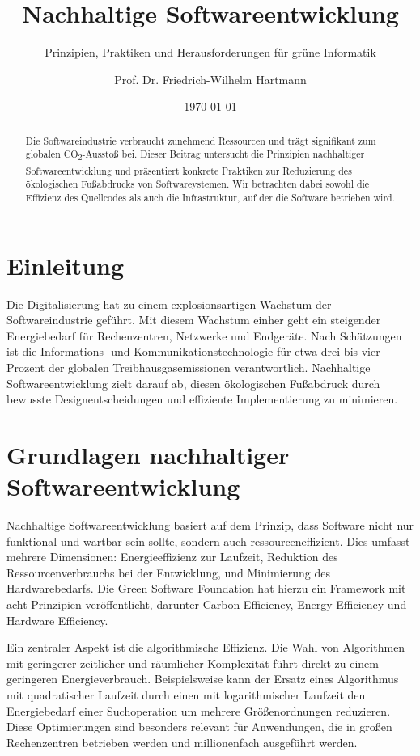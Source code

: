 \documentclass[
    language=ngerman,
    doctype=article,
]{../../omnilatex}
\title{Nachhaltige Softwareentwicklung}
\subtitle{Prinzipien, Praktiken und Herausforderungen für grüne Informatik}
\author{Prof. Dr. Friedrich-Wilhelm Hartmann}
\date{\today}
\begin{document}
\maketitle

\begin{abstract}
Die Softwareindustrie verbraucht zunehmend Ressourcen und trägt signifikant zum globalen CO\textsubscript{2}-Ausstoß bei. Dieser Beitrag untersucht die Prinzipien nachhaltiger Softwareentwicklung und präsentiert konkrete Praktiken zur Reduzierung des ökologischen Fußabdrucks von Softwareystemen. Wir betrachten dabei sowohl die Effizienz des Quellcodes als auch die Infrastruktur, auf der die Software betrieben wird.
\end{abstract}

\section{Einleitung}
Die Digitalisierung hat zu einem explosionsartigen Wachstum der Softwareindustrie geführt. Mit diesem Wachstum einher geht ein steigender Energiebedarf für Rechenzentren, Netzwerke und Endgeräte. Nach Schätzungen ist die Informations- und Kommunikationstechnologie für etwa drei bis vier Prozent der globalen Treibhausgasemissionen verantwortlich. Nachhaltige Softwareentwicklung zielt darauf ab, diesen ökologischen Fußabdruck durch bewusste Designentscheidungen und effiziente Implementierung zu minimieren.

\section{Grundlagen nachhaltiger Softwareentwicklung}
Nachhaltige Softwareentwicklung basiert auf dem Prinzip, dass Software nicht nur funktional und wartbar sein sollte, sondern auch ressourceneffizient. Dies umfasst mehrere Dimensionen: Energieeffizienz zur Laufzeit, Reduktion des Ressourcenverbrauchs bei der Entwicklung, und Minimierung des Hardwarebedarfs. Die Green Software Foundation hat hierzu ein Framework mit acht Prinzipien veröffentlicht, darunter Carbon Efficiency, Energy Efficiency und Hardware Efficiency.

Ein zentraler Aspekt ist die algorithmische Effizienz. Die Wahl von Algorithmen mit geringerer zeitlicher und räumlicher Komplexität führt direkt zu einem geringeren Energieverbrauch. Beispielsweise kann der Ersatz eines Algorithmus mit quadratischer Laufzeit durch einen mit logarithmischer Laufzeit den Energiebedarf einer Suchoperation um mehrere Größenordnungen reduzieren. Diese Optimierungen sind besonders relevant für Anwendungen, die in großen Rechenzentren betrieben werden und millionenfach ausgeführt werden.
\end{document}
